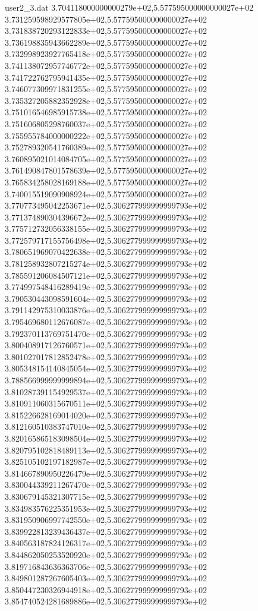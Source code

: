 \begin{filecontents}{user2_3.dat}
3.704118000000000279e+02,5.577595000000000027e+02
3.731259598929577805e+02,5.577595000000000027e+02
3.731838720293122833e+02,5.577595000000000027e+02
3.736198835943662289e+02,5.577595000000000027e+02
3.732998923927765418e+02,5.577595000000000027e+02
3.741138072957746772e+02,5.577595000000000027e+02
3.741722762795941435e+02,5.577595000000000027e+02
3.746077309971831255e+02,5.577595000000000027e+02
3.735327205882352928e+02,5.577595000000000027e+02
3.751016546985915738e+02,5.577595000000000027e+02
3.751606805298760037e+02,5.577595000000000027e+02
3.755955784000000222e+02,5.577595000000000027e+02
3.752789320541760389e+02,5.577595000000000027e+02
3.760895021014084705e+02,5.577595000000000027e+02
3.761490847801578639e+02,5.577595000000000027e+02
3.765834258028169188e+02,5.577595000000000027e+02
3.740015519090908924e+02,5.577595000000000027e+02
3.770773495042253671e+02,5.306277999999999793e+02
3.771374890304396672e+02,5.306277999999999793e+02
3.775712732056338155e+02,5.306277999999999793e+02
3.772579717155756498e+02,5.306277999999999793e+02
3.780651969070422638e+02,5.306277999999999793e+02
3.781258932807215274e+02,5.306277999999999793e+02
3.785591206084507121e+02,5.306277999999999793e+02
3.774997548416289419e+02,5.306277999999999793e+02
3.790530443098591604e+02,5.306277999999999793e+02
3.791142975310033876e+02,5.306277999999999793e+02
3.795469680112676087e+02,5.306277999999999793e+02
3.792370113769751470e+02,5.306277999999999793e+02
3.800408917126760571e+02,5.306277999999999793e+02
3.801027017812852478e+02,5.306277999999999793e+02
3.805348154140845054e+02,5.306277999999999793e+02
3.788566999999999894e+02,5.306277999999999793e+02
3.810287391154929537e+02,5.306277999999999793e+02
3.810911060315670511e+02,5.306277999999999793e+02
3.815226628169014020e+02,5.306277999999999793e+02
3.812160510383747010e+02,5.306277999999999793e+02
3.820165865183098504e+02,5.306277999999999793e+02
3.820795102818489113e+02,5.306277999999999793e+02
3.825105102197182987e+02,5.306277999999999793e+02
3.814667890950226479e+02,5.306277999999999793e+02
3.830044339211267470e+02,5.306277999999999793e+02
3.830679145321307715e+02,5.306277999999999793e+02
3.834983576225351953e+02,5.306277999999999793e+02
3.831950906997742550e+02,5.306277999999999793e+02
3.839922813239436437e+02,5.306277999999999793e+02
3.840563187824126317e+02,5.306277999999999793e+02
3.844862050253520920e+02,5.306277999999999793e+02
3.819716843636363706e+02,5.306277999999999793e+02
3.849801287267605403e+02,5.306277999999999793e+02
3.850447230326944918e+02,5.306277999999999793e+02
3.854740524281689886e+02,5.306277999999999793e+02

\end{filecontents}
